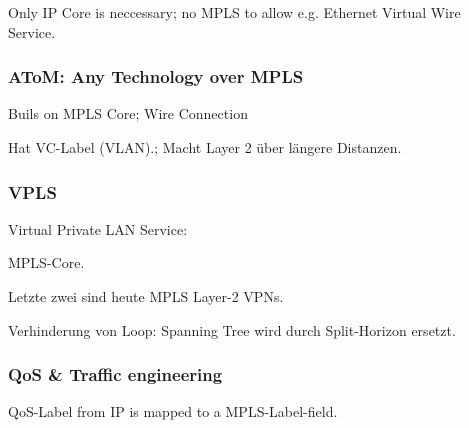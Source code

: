 Only IP Core is neccessary; no MPLS to allow e.g. Ethernet Virtual Wire Service.

\subsubsection{AToM: Any Technology over MPLS}

Buils on MPLS Core; Wire Connection

Hat VC-Label (VLAN).; Macht Layer 2 über längere Distanzen.

\subsubsection{VPLS}

Virtual Private LAN Service:

MPLS-Core.

Letzte zwei sind heute MPLS Layer-2 VPNs.

Verhinderung von Loop: Spanning Tree wird durch Split-Horizon ersetzt.


\subsubsection{QoS \& Traffic engineering}

QoS-Label from IP is mapped to a MPLS-Label-field.



